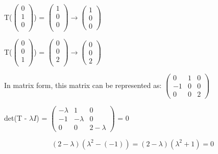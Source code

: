 \documentclass[12pt]{article}
\begin{document}
\begin{enumerate}
    T($\begin{pmatrix}
        0 \\
        1 \\
        0 \\
    \end{pmatrix}$) = $\begin{pmatrix}
        1 \\
        0 \\
        0 \\
    \end{pmatrix} \rightarrow\begin{pmatrix}
        1 \\
        0 \\
        0
    \end{pmatrix}$

    T($\begin{pmatrix}
        0 \\
        0 \\
        1 \\
    \end{pmatrix}$) = $\begin{pmatrix}
        0 \\
        0 \\
        2 \\
    \end{pmatrix} \rightarrow \begin{pmatrix}
        0 \\
        0 \\
        2
    \end{pmatrix}$

    In matrix form, this matrix can be represented as: 
    $\begin{pmatrix}
        0 & 1 & 0 \\
        -1 & 0 & 0 \\
        0 & 0 & 2
    \end{pmatrix}$

    det(T - $\lambda I$) =  $\begin{pmatrix}
        -\lambda & 1 & 0 \\
        -1 & -\lambda & 0 \\
        0 & 0 & 2 - \lambda
    \end{pmatrix}$ = 0

    \begin{equation}
        (2 - \lambda)(\lambda^2 - (-1)) = (2 - \lambda)(\lambda^2 + 1) = 0
    \end{equation}


\end{enumerate}
\end{document}
